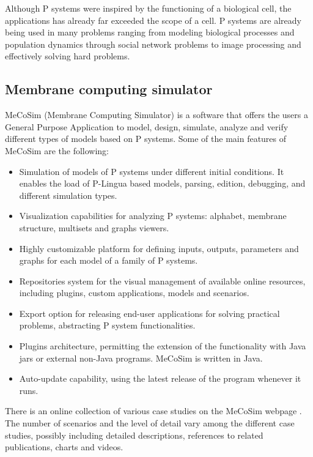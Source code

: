 Although P systems were inspired by the functioning of a biological cell, the applications has already far exceeded the scope of a cell. P systems are already being used in many problems ranging from modeling biological processes and population dynamics through social network problems to image processing and effectively solving hard problems.

\subsection{Membrane computing simulator} %
\label{sub:mecosym}

 MeCoSim (Membrane Computing Simulator) \cite{Perez10MeCoSim} is a software that offers the users a General Purpose Application to model, design, simulate, analyze and verify different types of models based on P systems. Some of the main features of MeCoSim are the following:
\begin{itemize}
  \item Simulation of models of P systems under different initial conditions. It enables the load of P-Lingua based models, parsing, edition, debugging, and different simulation types.
  \item Visualization capabilities for analyzing P systems: alphabet, membrane structure, multisets and graphs viewers.
  \item Highly customizable platform for defining inputs, outputs, parameters and graphs for each model of a family of P systems.
  \item Repositories system for the visual management of available online resources, including plugins, custom applications, models and scenarios.
  \item Export option for releasing end-user applications for solving practical problems, abstracting P system functionalities.
  \item Plugins architecture, permitting the extension of the functionality with Java jars or external non-Java programs. MeCoSim is written in Java.
  \item Auto-update capability, using the latest release of the program whenever it runs.
\end{itemize}

There is an online collection of various case studies on the MeCoSim webpage \cite{MeCoSimWeb}. The number of scenarios and the level of detail vary among the different case studies, possibly including detailed descriptions, references to related publications, charts and videos.

